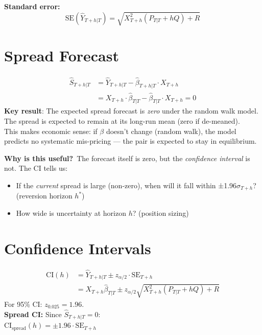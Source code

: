 \documentclass[10pt,a4paper,twocolumn]{article}
\begin{document}
\noindent\textbf{Standard error:}
\[
  \mathrm{SE}(\hat{Y}_{T+h|T}) = \sqrt{X_{T+h}^2(P_{T|T}+hQ)+R}
\]

\section{Spread Forecast}

\begin{tcolorbox}[mathbox={Formula 5 --- Spread Forecast}]
\vspace{-4pt}
\begin{align}
  \hat{S}_{T+h|T} &= \hat{Y}_{T+h|T} - \hat\beta_{T+h|T}\cdot X_{T+h}\nonumber\\
                  &= X_{T+h}\cdot\hat\beta_{T|T} - \hat\beta_{T|T}\cdot X_{T+h} = 0
  \label{eq:spread_fc}
\end{align}
\vspace{-4pt}
\textbf{Key result}: The expected spread forecast is \emph{zero} under the
random walk model.  The spread is expected to remain at its long-run
mean (zero if de-meaned).\\[2pt]
This makes economic sense: if $\beta$ doesn't change (random walk), the
model predicts no systematic mis-pricing --- the pair is expected to stay
in equilibrium.
\end{tcolorbox}

\noindent\textbf{Why is this useful?}~The forecast itself is zero, but the
\emph{confidence interval} is not.  The CI tells us:
\begin{itemize}\setlength\itemsep{0pt}
  \item If the \emph{current} spread is large (non-zero), when will it
    fall within ±1.96$\sigma_{T+h}$? (reversion horizon $h^*$)
  \item How wide is uncertainty at horizon $h$? (position sizing)
\end{itemize}

\section{Confidence Intervals}

\begin{tcolorbox}[mathbox={Formula 6 --- Prediction Intervals}]
\vspace{-4pt}
\begin{align}
  \mathrm{CI}(h) &= \hat{Y}_{T+h|T} \pm z_{\alpha/2}\cdot\mathrm{SE}_{T+h}\\[3pt]
  &= X_{T+h}\hat\beta_{T|T}
     \pm z_{\alpha/2}\sqrt{X_{T+h}^2(P_{T|T}+hQ)+R}
\end{align}
\vspace{-4pt}
For 95\% CI: $z_{0.025} = 1.96$.\\[2pt]
\textbf{Spread CI:} Since $\hat{S}_{T+h|T} = 0$:\\
$\mathrm{CI}_{\text{spread}}(h) = \pm 1.96\cdot\mathrm{SE}_{T+h}$
\end{tcolorbox}
\end{document}

